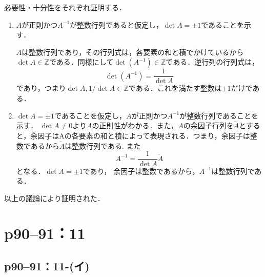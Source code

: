 \begin{tproof}
  必要性・十分性をそれぞれ証明する．
  \begin{enumerate}
    \item $A$が正則かつ$A^{-1}$が整数行列であると仮定し，$\det A=\pm 1$であることを示す．

          $A$は整数行列であり，その行列式は，各要素の和と積でかけているから$\det A \in \mathbb{Z}$である．同様にして$\det (A^{-1}) \in \mathbb{Z}$である．逆行列の行列式は，
          \[
            \det (A^{-1})=\frac{1}{\det A}
          \]
          であり，つまり$\det A,1/\det A \in \mathbb{Z}$である．これを満たす整数は$\pm 1$だけである．
    \item $\det A=\pm 1$であることを仮定し，$A$が正則かつ$A^{-1}$が整数行列であることを示す．
          $\det A \neq 0$より$A$の正則性がわかる．また，$A$の余因子行列を$\tilde{A}$とすると，余因子はAの各要素の和と積によって表現される．つまり，余因子は整数であるから$\tilde{A}$は整数行列である. また
          \[
            A^{-1}=\frac{1}{\det A}\tilde{A}
          \]
          となる．$\det A=\pm 1$であり， 余因子は整数であるから，$A^{-1}$は整数行列である．
  \end{enumerate}
  以上の議論により証明された．
\end{tproof}



\section*{p90--91：11}

\subsection*{p90--91：11-(イ)}

